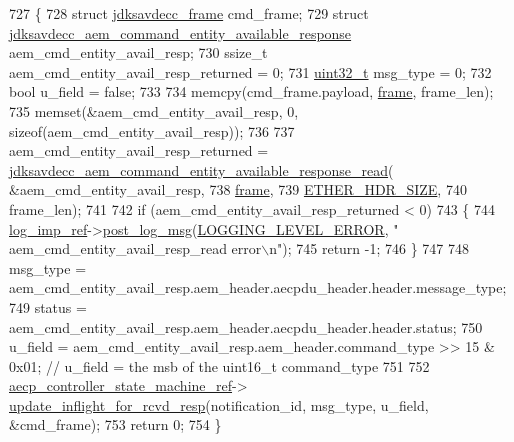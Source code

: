 \begin{DoxyCode}
727 \{
728     \textcolor{keyword}{struct }\hyperlink{structjdksavdecc__frame}{jdksavdecc\_frame} cmd\_frame;
729     \textcolor{keyword}{struct }\hyperlink{structjdksavdecc__aem__command__entity__available__response}{jdksavdecc\_aem\_command\_entity\_available\_response}
       aem\_cmd\_entity\_avail\_resp;
730     ssize\_t aem\_cmd\_entity\_avail\_resp\_returned = 0;
731     \hyperlink{parse_8c_a6eb1e68cc391dd753bc8ce896dbb8315}{uint32\_t} msg\_type = 0;
732     \textcolor{keywordtype}{bool} u\_field = \textcolor{keyword}{false};
733 
734     memcpy(cmd\_frame.payload, \hyperlink{gst__avb__playbin_8c_ac8e710e0b5e994c0545d75d69868c6f0}{frame}, frame\_len);
735     memset(&aem\_cmd\_entity\_avail\_resp, 0, \textcolor{keyword}{sizeof}(aem\_cmd\_entity\_avail\_resp));
736 
737     aem\_cmd\_entity\_avail\_resp\_returned = 
      \hyperlink{group__command__entity__available__response_gabde2ccc31e53407a8978e67880226568}{jdksavdecc\_aem\_command\_entity\_available\_response\_read}(
      &aem\_cmd\_entity\_avail\_resp,
738                                                                                                
      \hyperlink{gst__avb__playbin_8c_ac8e710e0b5e994c0545d75d69868c6f0}{frame},
739                                                                                                
      \hyperlink{namespaceavdecc__lib_a6c827b1a0d973e18119c5e3da518e65ca9512ad9b34302ba7048d88197e0a2dc0}{ETHER\_HDR\_SIZE},
740                                                                                                frame\_len);
741 
742     \textcolor{keywordflow}{if} (aem\_cmd\_entity\_avail\_resp\_returned < 0)
743     \{
744         \hyperlink{namespaceavdecc__lib_acbe3e2a96ae6524943ca532c87a28529}{log\_imp\_ref}->\hyperlink{classavdecc__lib_1_1log_a68139a6297697e4ccebf36ccfd02e44a}{post\_log\_msg}(\hyperlink{namespaceavdecc__lib_a501055c431e6872ef46f252ad13f85cdaf2c4481208273451a6f5c7bb9770ec8a}{LOGGING\_LEVEL\_ERROR}, \textcolor{stringliteral}{"
      aem\_cmd\_entity\_avail\_resp\_read error\(\backslash\)n"});
745         \textcolor{keywordflow}{return} -1;
746     \}
747 
748     msg\_type = aem\_cmd\_entity\_avail\_resp.aem\_header.aecpdu\_header.header.message\_type;
749     status = aem\_cmd\_entity\_avail\_resp.aem\_header.aecpdu\_header.header.status;
750     u\_field = aem\_cmd\_entity\_avail\_resp.aem\_header.command\_type >> 15 & 0x01; \textcolor{comment}{// u\_field = the msb of the
       uint16\_t command\_type}
751 
752     \hyperlink{namespaceavdecc__lib_a0b1b5aea3c0490f77cbfd9178af5be22}{aecp\_controller\_state\_machine\_ref}->
      \hyperlink{classavdecc__lib_1_1aecp__controller__state__machine_a997abd9786c330a5505e903e6443208e}{update\_inflight\_for\_rcvd\_resp}(notification\_id, msg\_type, u\_field, &cmd\_frame);
753     \textcolor{keywordflow}{return} 0;
754 \}
\end{DoxyCode}


